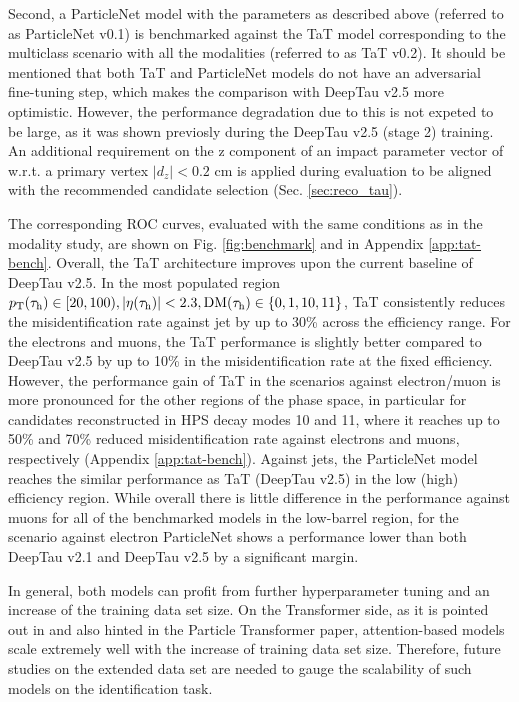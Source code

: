 Second, a ParticleNet model with the parameters as described above (referred to as ParticleNet v0.1) is benchmarked against the TaT model corresponding to the multiclass scenario with all the modalities (referred to as TaT v0.2). It should be mentioned that both TaT and ParticleNet models do not have an adversarial fine-tuning step, which makes the comparison with DeepTau v2.5 more optimistic. However, the performance degradation due to this is not expeted to be large, as it was shown previosly during the DeepTau v2.5 (stage 2) training. An additional requirement on the z component of an impact parameter vector of \tauh w.r.t. a primary vertex $|d_z| < 0.2$ cm is applied during evaluation to be aligned with the recommended \tauh candidate selection (Sec. \ref{sec:reco_tau}). 

The corresponding ROC curves, evaluated with the same conditions as in the modality study, are shown on Fig. \ref{fig:benchmark} and in Appendix \ref{app:tat-bench}. Overall, the TaT architecture improves upon the current baseline of DeepTau v2.5. In the most populated region $p_\text{T}(\tau_\mathrm{h}) \in [20,100), |\eta(\tau_\mathrm{h})| < 2.3, \text{DM}(\tau_\mathrm{h}) \in \{0,1,10,11\}$, TaT consistently reduces the misidentification rate against jet by up to 30\% across the \tauh efficiency range. For the electrons and muons, the TaT performance is slightly better compared to DeepTau v2.5 by up to 10\% in the misidentification rate at the fixed \tauh efficiency. However, the performance gain of TaT in the scenarios against electron/muon is more pronounced for the other regions of the phase space, in particular for \tauh candidates reconstructed in HPS decay modes 10 and 11, where it reaches up to 50\% and 70\% reduced misidentification rate against electrons and muons, respectively (Appendix \ref{app:tat-bench}). Against jets, the ParticleNet model reaches the similar performance as TaT (DeepTau v2.5) in the low (high) \tauh efficiency region. While overall there is little difference in the performance against muons for all of the benchmarked models in the low-\pt barrel region, for the scenario against electron ParticleNet shows a performance lower than both DeepTau v2.1 and DeepTau v2.5 by a significant margin.

In general, both models can profit from further hyperparameter tuning and an increase of the training data set size. On the Transformer side, as it is pointed out in \cite{hoffmann2022training} and also hinted in the Particle Transformer paper, attention-based models scale extremely well with the increase of training data set size. Therefore, future studies on the extended data set are needed to gauge the scalability of such models on the \tauh identification task.

